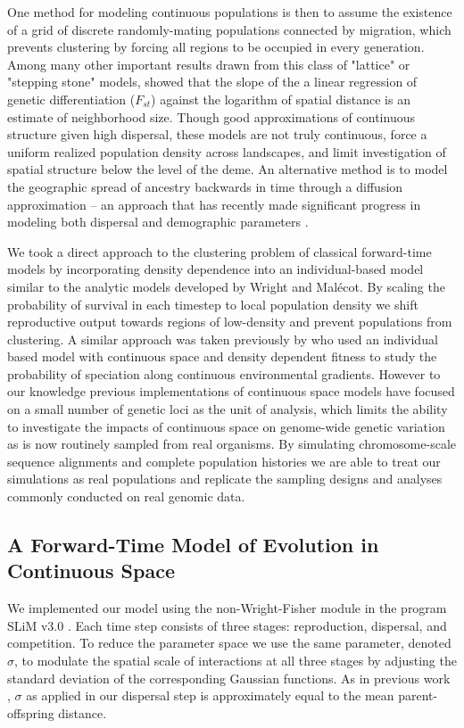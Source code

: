\documentclass[10pt,twoside,lineno]{gsajnl}
\begin{document}
One method for modeling continuous populations is then to assume the existence of a grid of discrete randomly-mating populations connected by migration, which prevents clustering by forcing all regions to be occupied in every generation. Among many other important results drawn from this class of "lattice" or "stepping stone" models, \cite{Rousset1997} showed that the slope of the a linear regression of genetic differentiation ($F_{st}$) against the logarithm of spatial distance is an estimate of neighborhood size. Though good approximations of continuous structure given high dispersal, these models are not truly continuous, force a uniform realized population density across landscapes, and limit investigation of spatial structure below the level of the deme. An alternative method is to model the geographic spread of ancestry backwards in time through a diffusion approximation -- an approach that has recently made significant progress in modeling both dispersal and demographic parameters \citep{Barton2010,Kelleher2014,Ringbauer2017,Ringbauer2018}.

We took a direct approach to the clustering problem of classical forward-time models by incorporating density dependence into an individual-based model similar to the analytic models developed by Wright and Malécot. By scaling the probability of survival in each timestep to local population density we shift reproductive output towards regions of low-density and prevent populations from clustering. A similar approach was taken previously by \citep{Doebeli2003} who used an individual based model with continuous space and density dependent fitness to study the probability of speciation along continuous environmental gradients. However to our knowledge previous implementations of continuous space models have focused on a small number of genetic loci as the unit of analysis, which limits the ability to investigate the impacts of continuous space on genome-wide genetic variation as is now routinely sampled from real organisms. By simulating chromosome-scale sequence alignments and complete population histories we are able to treat our simulations as real populations and replicate the sampling designs and analyses commonly conducted on real genomic data.
\subsection{A Forward-Time Model of Evolution in Continuous Space}

We implemented our model using the non-Wright-Fisher module in the program SLiM v3.0 \citep{Haller2019}. Each time step consists of three stages: reproduction, dispersal, and competition. To reduce the parameter space we use the same parameter, denoted $\sigma$, to modulate the spatial scale of interactions at all three stages by adjusting the standard deviation of the corresponding Gaussian functions. As in previous work \citep{Wright1943,Ringbauer2017}, $\sigma$ as applied in our dispersal step is approximately equal to the mean parent-offspring distance.  
\end{document}
